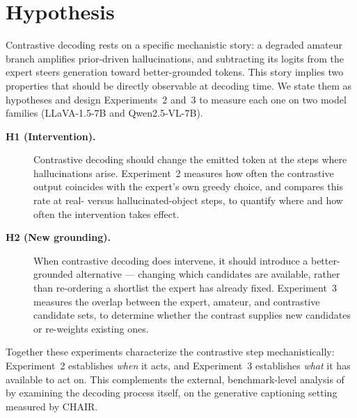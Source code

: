 
\section{Hypothesis}
\label{sec:cdmech-hypothesis}

Contrastive decoding rests on a specific mechanistic story: a degraded amateur
branch amplifies prior-driven hallucinations, and subtracting its logits from
the expert steers generation toward better-grounded tokens. This story implies
two properties that should be directly observable at decoding time. We state
them as hypotheses and design Experiments~2 and~3 to measure each one on two
model families (LLaVA-1.5-7B and Qwen2.5-VL-7B).

\begin{description}
  \item[\textbf{H1 (Intervention).}] Contrastive decoding should change the
  emitted token at the steps where hallucinations arise. Experiment~2 measures
  how often the contrastive output coincides with the expert's own greedy
  choice, and compares this rate at real- versus hallucinated-object steps, to
  quantify where and how often the intervention takes effect.
  \item[\textbf{H2 (New grounding).}] When contrastive decoding does intervene,
  it should introduce a better-grounded alternative --- changing which
  candidates are available, rather than re-ordering a shortlist the expert has
  already fixed. Experiment~3 measures the overlap between the expert, amateur,
  and contrastive candidate sets, to determine whether the contrast supplies new
  candidates or re-weights existing ones.
\end{description}

\noindent Together these experiments characterize the contrastive step
mechanistically: Experiment~2 establishes \emph{when} it acts, and Experiment~3
establishes \emph{what} it has available to act on. This complements the
external, benchmark-level analysis of \citet{yin2025mirage} by examining the
decoding process itself, on the generative captioning setting measured by CHAIR.
